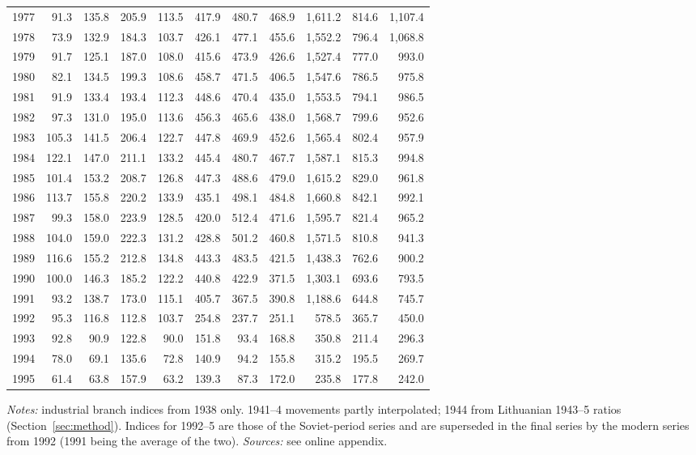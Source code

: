 \begin{longtable}{r*{10}{r}}
1977 & 91.3 & 135.8 & 205.9 & 113.5 & 417.9 & 480.7 & 468.9 & 1,611.2 & 814.6 & 1,107.4 \\
1978 & 73.9 & 132.9 & 184.3 & 103.7 & 426.1 & 477.1 & 455.6 & 1,552.2 & 796.4 & 1,068.8 \\
1979 & 91.7 & 125.1 & 187.0 & 108.0 & 415.6 & 473.9 & 426.6 & 1,527.4 & 777.0 & 993.0 \\
1980 & 82.1 & 134.5 & 199.3 & 108.6 & 458.7 & 471.5 & 406.5 & 1,547.6 & 786.5 & 975.8 \\
1981 & 91.9 & 133.4 & 193.4 & 112.3 & 448.6 & 470.4 & 435.0 & 1,553.5 & 794.1 & 986.5 \\
1982 & 97.3 & 131.0 & 195.0 & 113.6 & 456.3 & 465.6 & 438.0 & 1,568.7 & 799.6 & 952.6 \\
1983 & 105.3 & 141.5 & 206.4 & 122.7 & 447.8 & 469.9 & 452.6 & 1,565.4 & 802.4 & 957.9 \\
1984 & 122.1 & 147.0 & 211.1 & 133.2 & 445.4 & 480.7 & 467.7 & 1,587.1 & 815.3 & 994.8 \\
1985 & 101.4 & 153.2 & 208.7 & 126.8 & 447.3 & 488.6 & 479.0 & 1,615.2 & 829.0 & 961.8 \\
1986 & 113.7 & 155.8 & 220.2 & 133.9 & 435.1 & 498.1 & 484.8 & 1,660.8 & 842.1 & 992.1 \\
1987 & 99.3 & 158.0 & 223.9 & 128.5 & 420.0 & 512.4 & 471.6 & 1,595.7 & 821.4 & 965.2 \\
1988 & 104.0 & 159.0 & 222.3 & 131.2 & 428.8 & 501.2 & 460.8 & 1,571.5 & 810.8 & 941.3 \\
1989 & 116.6 & 155.2 & 212.8 & 134.8 & 443.3 & 483.5 & 421.5 & 1,438.3 & 762.6 & 900.2 \\
1990 & 100.0 & 146.3 & 185.2 & 122.2 & 440.8 & 422.9 & 371.5 & 1,303.1 & 693.6 & 793.5 \\
1991 & 93.2 & 138.7 & 173.0 & 115.1 & 405.7 & 367.5 & 390.8 & 1,188.6 & 644.8 & 745.7 \\
1992 & 95.3 & 116.8 & 112.8 & 103.7 & 254.8 & 237.7 & 251.1 & 578.5 & 365.7 & 450.0 \\
1993 & 92.8 & 90.9 & 122.8 & 90.0 & 151.8 & 93.4 & 168.8 & 350.8 & 211.4 & 296.3 \\
1994 & 78.0 & 69.1 & 135.6 & 72.8 & 140.9 & 94.2 & 155.8 & 315.2 & 195.5 & 269.7 \\
1995 & 61.4 & 63.8 & 157.9 & 63.2 & 139.3 & 87.3 & 172.0 & 235.8 & 177.8 & 242.0 \\
\end{longtable}
\vspace{-1.2em}\noindent\begin{minipage}{\textwidth}\footnotesize \textit{Notes:} industrial branch indices from 1938 only. 1941--4 movements partly interpolated; 1944 from Lithuanian 1943--5 ratios (Section~\ref{sec:method}). Indices for 1992--5 are those of the Soviet-period series and are superseded in the final series by the modern series from 1992 (1991 being the average of the two). \textit{Sources:} see online appendix.\end{minipage}\vspace{1em}
